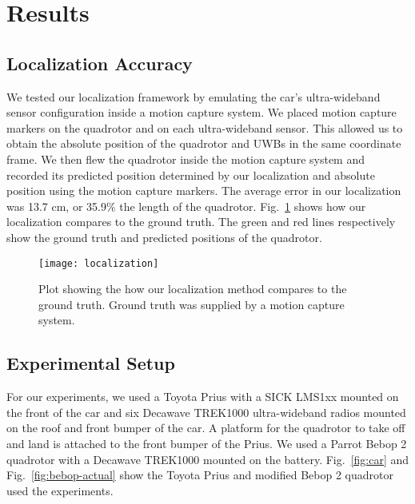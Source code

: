 
\section{Results}

\subsection{Localization Accuracy}

We tested our localization framework by emulating the car's ultra-wideband
sensor configuration inside a motion capture system. We placed motion capture
markers on the quadrotor and on each ultra-wideband sensor. This allowed us to
obtain the absolute position of the quadrotor and UWBs in the same coordinate
frame. We then flew the quadrotor inside the motion capture system and recorded
its predicted position determined by our localization and absolute position
using the motion capture markers. The average error in our localization was
13.7 cm, or 35.9\% the length of the quadrotor. Fig.~\ref{fig:localization}
shows how our localization compares to the ground truth. The green and red
lines respectively show the ground truth and predicted positions of the
quadrotor.

\begin{figure}

    \centering

    \texttt{[image: localization]}

    \caption{Plot showing the how our localization method compares to the
    ground truth. Ground truth was supplied by a motion capture system.}

    \label{fig:localization}

\end{figure}

\subsection{Experimental Setup}

For our experiments, we used a Toyota Prius with a SICK LMS1xx mounted on the
front of the car and six Decawave TREK1000 ultra-wideband radios mounted on the
roof and front bumper of the car. A platform for the quadrotor to take off and
land is attached to the front bumper of the Prius. We used a Parrot Bebop 2
quadrotor with a Decawave TREK1000 mounted on the battery.  Fig.~\ref{fig:car}
and Fig.~\ref{fig:bebop-actual} show the Toyota Prius and modified Bebop 2
quadrotor used the experiments.

